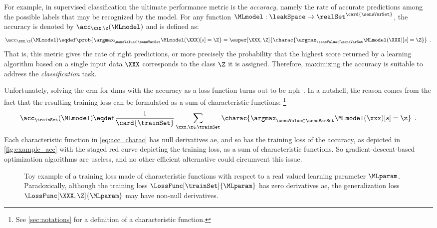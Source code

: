 For example, in supervised classification the ultimate performance metric is the \emph{accuracy}, namely the rate of accurate predictions among the possible labels that may be recognized by the model.
For any function \(\MLmodel: \leakSpace \rightarrow \realSet^{\card{\sensVarSet}}\), the accuracy is denoted by \(\acc_{\XXX, \Z}(\MLmodel)\) and is defined as:
\begin{equation}
	\acc_{\XXX, \Z}(\MLmodel) \eqdef \prob{\argmax_{\sensValue \in \sensVarSet}\MLmodel(\XXX)[s] = \Z} 
	 = \esper[\XXX, \Z]{\charac{\argmax_{\sensValue \in \sensVarSet}\MLmodel(\XXX)[s] = \Z}}
	\enspace .
\end{equation}
That is, this metric gives the rate of right predictions, or more precisely the probability that the highest score returned by a learning algorithm based on a single input data \(\XXX\) corresponds to the class \(\Z\) it is assigned.
Therefore, maximizing the accuracy is suitable to address the \emph{classification} task.

Unfortunately, solving the \gls{erm} for \glspl{dnn} with the accuracy as a loss function turns out to be \gls{nph}~\cite[Sec.~20.5]{shalev-shwartz_understanding_2014}.
In a nutshell, the reason comes from the fact that the resulting training loss can be formulated as a sum of characteristic functions:%
\footnote{
	See \autoref{sec:notations} for a definition of a characteristic function.
}
\begin{equation}
	\acc_{\trainSet}(\MLmodel) \eqdef \frac{1}{\card{\trainSet}} \sum_{\xxx, \z \in \trainSet} \charac{\argmax_{\sensValue \in \sensVarSet}\MLmodel(\xxx)[s] = \z} \enspace .
	\label{eq:acc_charac}
\end{equation}
Each characteristic function in \autoref{eq:acc_charac} has null derivatives \gls{ae}, and so has the training loss of the accuracy, as depicted in \autoref{fig:example_acc} with the staged red curve depicting the training loss, as a sum of characteristic functions.
So gradient-descent-based optimization algorithms are useless, and no other efficient alternative could circumvent this issue.
\begin{figure}
	\centering
	\caption{Toy example of a training loss made of characteristic functions with respect to a real valued learning parameter \(\MLparam\).
	Paradoxically, although the training loss \(\LossFunc[\trainSet]{\MLparam}\) has zero derivatives \gls{ae}, the generalization loss \(\LossFunc[\XXX, \Z]{\MLparam}\) may have non-null derivatives.}
	\label{fig:example_acc}
\end{figure}

